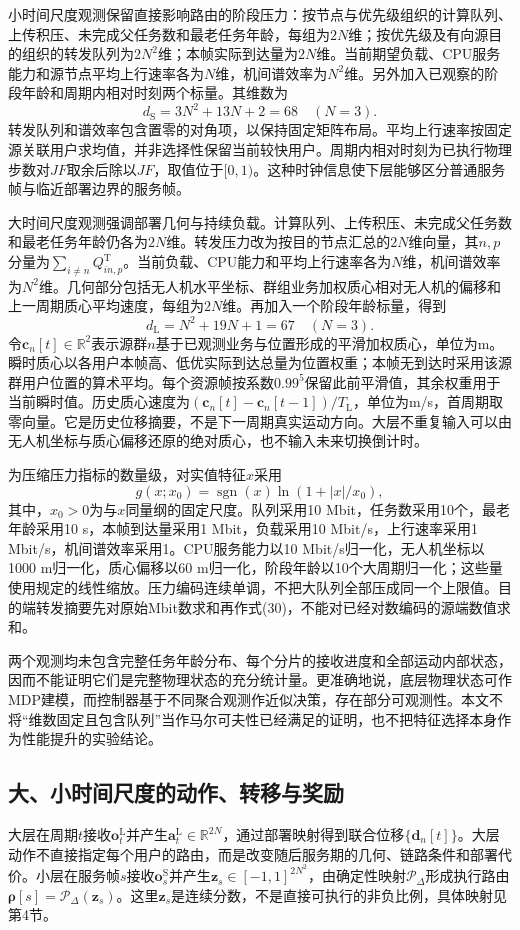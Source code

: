 小时间尺度观测保留直接影响路由的阶段压力：按节点与优先级组织的计算队列、上传积压、未完成父任务数和最老任务年龄，每组为$2N$维；按优先级及有向源目的组织的转发队列为$2N^2$维；本帧实际到达量为$2N$维。当前期望负载、CPU服务能力和源节点平均上行速率各为$N$维，机间谱效率为$N^2$维。另外加入已观察的阶段年龄和周期内相对时刻两个标量。其维数为
\[
d_{\mathrm S}=3N^2+13N+2=68\quad(N=3).\tag{28}
\]
转发队列和谱效率包含置零的对角项，以保持固定矩阵布局。平均上行速率按固定源关联用户求均值，并非选择性保留当前较快用户。周期内相对时刻为已执行物理步数对$JF$取余后除以$JF$，取值位于$[0,1)$。这种时钟信息使下层能够区分普通服务帧与临近部署边界的服务帧。

大时间尺度观测强调部署几何与持续负载。计算队列、上传积压、未完成父任务数和最老任务年龄仍各为$2N$维。转发压力改为按目的节点汇总的$2N$维向量，其$n,p$分量为$\sum_{i\ne n}Q_{in,p}^{\mathrm T}$。当前负载、CPU能力和平均上行速率各为$N$维，机间谱效率为$N^2$维。几何部分包括无人机水平坐标、群组业务加权质心相对无人机的偏移和上一周期质心平均速度，每组为$2N$维。再加入一个阶段年龄标量，得到
\[
d_{\mathrm L}=N^2+19N+1=67\quad(N=3).\tag{29}
\]
令$\boldsymbol c_n[t]\in\mathbb{R}^2$表示源群$n$基于已观测业务与位置形成的平滑加权质心，单位为m。瞬时质心以各用户本帧高、低优实际到达总量为位置权重；本帧无到达时采用该源群用户位置的算术平均。每个资源帧按系数$0.99^5$保留此前平滑值，其余权重用于当前瞬时值。历史质心速度为$(\boldsymbol c_n[t]-\boldsymbol c_n[t-1])/T_{\mathrm L}$，单位为m/s，首周期取零向量。它是历史位移摘要，不是下一周期真实运动方向。大层不重复输入可以由无人机坐标与质心偏移还原的绝对质心，也不输入未来切换倒计时。

为压缩压力指标的数量级，对实值特征$x$采用
\[
g(x;x_0)=\operatorname{sgn}(x)\ln(1+|x|/x_0),\tag{30}
\]
其中，$x_0>0$为与$x$同量纲的固定尺度。队列采用10 Mbit，任务数采用10个，最老年龄采用10 s，本帧到达量采用1 Mbit，负载采用10 Mbit/s，上行速率采用1 Mbit/s，机间谱效率采用1。CPU服务能力以10 Mbit/s归一化，无人机坐标以1000 m归一化，质心偏移以60 m归一化，阶段年龄以10个大周期归一化；这些量使用规定的线性缩放。压力编码连续单调，不把大队列全部压成同一个上限值。目的端转发摘要先对原始Mbit数求和再作式(30)，不能对已经对数编码的源端数值求和。

两个观测均未包含完整任务年龄分布、每个分片的接收进度和全部运动内部状态，因而不能证明它们是完整物理状态的充分统计量。更准确地说，底层物理状态可作MDP建模，而控制器基于不同聚合观测作近似决策，存在部分可观测性。本文不将“维数固定且包含队列”当作马尔可夫性已经满足的证明，也不把特征选择本身作为性能提升的实验结论。

\subsection{大、小时间尺度的动作、转移与奖励}
大层在周期$t$接收$\boldsymbol o_t^{\mathrm L}$并产生$\boldsymbol a_t^{\mathrm L}\in\mathbb{R}^{2N}$，通过部署映射得到联合位移$\{\boldsymbol d_n[t]\}$。大层动作不直接指定每个用户的路由，而是改变随后服务期的几何、链路条件和部署代价。小层在服务帧$s$接收$\boldsymbol o_s^{\mathrm S}$并产生$\boldsymbol z_s\in[-1,1]^{2N^2}$，由确定性映射$\mathcal P_\Delta$形成执行路由$\boldsymbol\rho[s]=\mathcal P_\Delta(\boldsymbol z_s)$。这里$\boldsymbol z_s$是连续分数，不是直接可执行的非负比例，具体映射见第4节。

